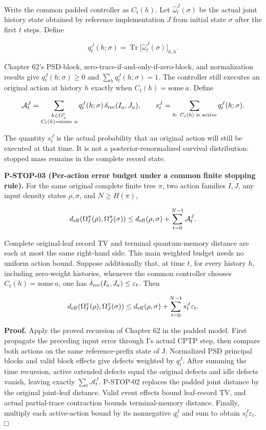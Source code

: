 \documentclass[
  11pt,
  oneside]{book}
\begin{document}
Write the common padded controller as \(C_t(h)\). Let
\(\widehat\omega_t^J(\sigma)\) be the actual joint history state
obtained by reference implementation \(J\) from initial state \(\sigma\)
after the first \(t\) steps. Define

\[
q_t^J(h;\sigma)
=\operatorname{Tr}\bigl[\widehat\omega_t^J(\sigma)\bigr]_{h,h}.
\]

Chapter 62's PSD-block, zero-trace-if-and-only-if-zero-block, and
normalization results give \(q_t^J(h;\sigma)\ge0\) and
\(\sum_hq_t^J(h;\sigma)=1\). The controller still executes an original
action at history \(h\) exactly when \(C_t(h)=\mathrm{some}\ a\). Define

\[
\mathcal A_t^J
=\sum_{\substack{h\in O_\bot^t\\ C_t(h)=\mathrm{some}\ a}}
q_t^J(h;\sigma)\,\delta_{\rm rec}(I_a,J_a),
\qquad
s_t^J=\sum_{h:\ C_t(h)\text{ is active}}q_t^J(h;\sigma).
\]

The quantity \(s_t^J\) is the actual probability that an original action
will still be executed at that time. It is not a posterior-renormalized
survival distribution: stopped mass remains in the complete record
state.

\label{p-stop-03}{}

\textbf{P-STOP-03 (Per-action error budget under a common finite
stopping rule).} For the same original complete finite tree \(\pi\), two
action families \(I,J\), any input density states \(\rho,\sigma\), and
\(N\ge H(\pi)\),

\[
d_{\rm eff}(\Omega_I^\pi(\rho),\Omega_J^\pi(\sigma))
\le d_{\rm eff}(\rho,\sigma)+\sum_{t=0}^{N-1}\mathcal A_t^J.
\]

Complete original-leaf record TV and terminal quantum-memory distance
are each at most the same right-hand side. This main weighted budget
needs no uniform action bound. Suppose additionally that, at time \(t\),
for every history \(h\), including zero-weight histories, whenever the
common controller chooses \(C_t(h)=\mathrm{some}\ a\), one has
\(\delta_{\rm rec}(I_a,J_a)\le\varepsilon_t\). Then

\[
d_{\rm eff}(\Omega_I^\pi(\rho),\Omega_J^\pi(\sigma))
\le d_{\rm eff}(\rho,\sigma)+\sum_{t=0}^{N-1}s_t^J\varepsilon_t.
\]

\textbf{Proof.} Apply the proved recursion of Chapter 62 in the padded
model. First propagate the preceding input error through I's actual CPTP
step, then compare both actions on the same reference-prefix state of J.
Normalized PSD principal blocks and valid block effects give defects
weighted by \(q_t^J\). After summing the time recursion, active extended
defects equal the original defects and idle defects vanish, leaving
exactly \(\sum_t\mathcal A_t^J\). P-STOP-02 replaces the padded joint
distance by the original joint-leaf distance. Valid event effects bound
leaf-record TV, and actual partial-trace contraction bounds
terminal-memory distance. Finally, multiply each active-action bound by
its nonnegative \(q_t^J\) and sum to obtain \(s_t^J\varepsilon_t\). □
\end{document}

